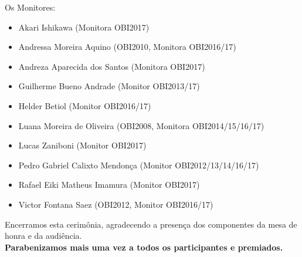 \documentclass{article}
\begin{document}
Os Monitores:

\begin{itemize}
\item Akari Ishikawa (Monitora OBI2017)
\item Andressa Moreira Aquino (OBI2010, Monitora OBI2016/17)
\item Andreza Aparecida dos Santos (Monitora OBI2017)
\item Guilherme Bueno Andrade (Monitor OBI2013/17)
\item Helder Betiol (Monitor OBI2016/17)
\item Luana Moreira de Oliveira (OBI2008, Monitora OBI2014/15/16/17)
\item Lucas Zaniboni (Monitor OBI2017)
\item Pedro Gabriel Calixto Mendonça (Monitor OBI2012/13/14/16/17)
\item Rafael Eiki Matheus Imamura (Monitor OBI2017)
\item Victor Fontana Saez (OBI2012, Monitor OBI2016/17)
\end{itemize}
\bigskip

Encerramos esta cerimônia, agradecendo a presença dos componentes da mesa de honra e da audiência.\\
\textbf{Parabenizamos mais uma vez a todos os participantes e premiados.}
\end{document}
